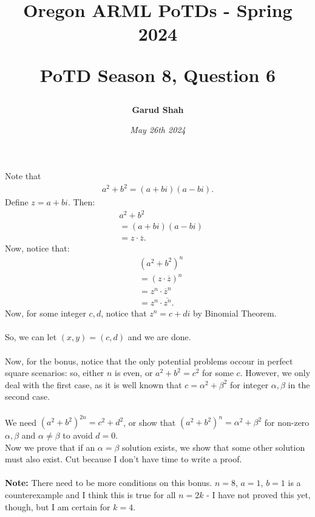 \documentclass{article}
\title{\begin{center}
    Oregon ARML PoTDs - Spring 2024
\end{center}
\begin{center}
    \textbf{PoTD Season 8, Question 6}
\end{center}}
\author{\textbf{Garud Shah}}
\date{\textit{May 26th 2024}}
\begin{document}
\maketitle
\newpage
Note that 
\begin{align*}
    a^2 + b^2 = (a + bi)(a - bi).
\end{align*}
Define $z = a + bi$. Then:
\begin{align*}
    & a^2 + b^2 \\
    &= (a + bi)(a - bi) \\
    &= z \cdot \overline{z}.
\end{align*}
Now, notice that:
\begin{align*}
    & (a^2 + b^2)^n  \\
    &= (z \cdot \overline{z})^n \\
    &= z^n \cdot \overline{z}^n \\
    &= z^n \cdot \overline{z^n}.
\end{align*}
Now, for some integer $c, d$, notice that $z^n = c + di$ by Binomial Theorem. \\~\\
So, we can let $(x, y) = (c, d)$ and we are done. \\~\\
Now, for the bonus, notice that the only potential problems occour in perfect square scenarios: so, either $n$ is even, or
$a^2 + b^2 = c^2$ for some $c$. However, we only deal with the first case, as it is well known that $c = \alpha^2 + \beta^2$ for integer $\alpha, \beta$
in the second case. \\~\\
We need $(a^2 + b^2)^{2n} = c^2 + d^2$, or show that $(a^2 + b^2)^n = \alpha^2 + \beta^2$ for non-zero $\alpha, \beta$ and $\alpha \ne \beta$ 
to avoid $d=0$. \\ 
Now we prove that if an $\alpha = \beta$ solution exists, we show that some other solution must also exist. Cut because I don't have 
time to write a proof. \\~\\
\textbf{Note:} There need to be more conditions on this bonus. $n = 8$, $a = 1$, $b = 1$ is a counterexample and I think this is true for all 
$n = 2k$ - I have not proved this yet, though, but I am certain for $k = 4$.
\end{document}
